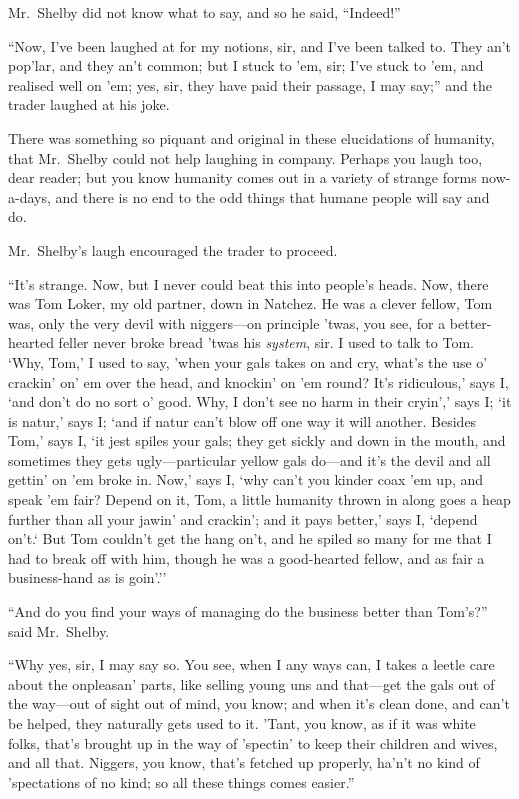 Mr.\ Shelby did not know what to say, and so he said, ``Indeed!''

``Now, I've been laughed at for my notions, sir, and I've been talked to. They
an't pop'lar, and they an't common; but I stuck to 'em, sir; I've stuck to 'em,
and realised well on 'em; yes, sir, they have paid their passage, I may say;''
and the trader laughed at his joke.

There was something so piquant and original in these elucidations of humanity,
that Mr.\ Shelby could not help laughing in company. Perhaps you laugh too, dear
reader; but you know humanity comes out in a variety of strange forms
now-a-days, and there is no end to the odd things that humane people will say
and do.

Mr.\ Shelby's laugh encouraged the trader to proceed.

``It's strange. Now, but I never could beat this into people's heads. Now, there
was Tom Loker, my old partner, down in Natchez. He was a clever fellow, Tom was,
only the very devil with niggers---on principle 'twas, you see, for
a better-hearted feller never broke bread 'twas his \emph{system}, sir. I used
to talk to Tom. `Why, Tom,' I used to say, 'when your gals takes on and cry,
what's the use o' crackin' on' em over the head, and knockin' on 'em round? It's
ridiculous,' says I, `and don't do no sort o' good. Why, I don't see no harm in
their cryin',' says I; `it is natur,' says I; `and if natur can't blow off one
way it will another. Besides Tom,' says I, `it jest spiles your gals; they get
sickly and down in the mouth, and sometimes they gets ugly---particular yellow
gals do---and it's the devil and all gettin' on 'em broke in. Now,' says I, `why
can't you kinder coax 'em up, and speak 'em fair? Depend on it, Tom, a little
humanity thrown in along goes a heap further than all your jawin' and crackin';
and it pays better,' says I, `depend on't.` But Tom couldn't get the hang on't,
and he spiled so many for me that I had to break off with him, though he was
a good-hearted fellow, and as fair a business-hand as is goin'.''

``And do you find your ways of managing do the business better than Tom's?''
said Mr.\ Shelby.

``Why yes, sir, I may say so. You see, when I any ways can, I takes a leetle
care about the onpleasan' parts, like selling young uns and that---get the gals
out of the way---out of sight out of mind, you know; and when it's clean done,
and can't be helped, they naturally gets used to it. 'Tant, you know, as if it
was white folks, that's brought up in the way of 'spectin' to keep their
children and wives, and all that. Niggers, you know, that's fetched up properly,
ha'n't no kind of 'spectations of no kind; so all these things comes easier.''

